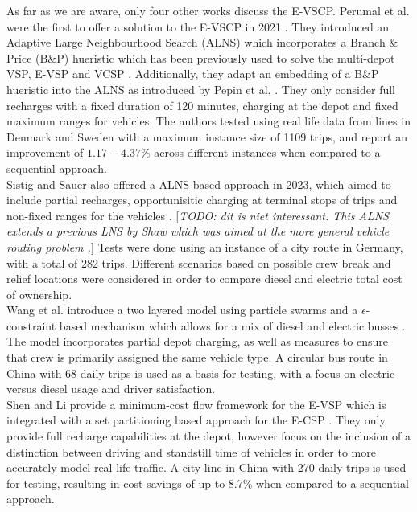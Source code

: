 \documentclass[]{article}
\newcommand{\todo}[1]{{\color{red}[\textit{TODO: #1}]}}
\begin{document}
As far as we are aware, only four other works discuss the E-VSCP. Perumal et al. were the first to offer a solution to the E-VSCP in 2021 \cite{PERUMAL2021105268}. They introduced an Adaptive Large Neighbourhood Search (ALNS) which incorporates a Branch \& Price (B\&P) hueristic which has been previously used to solve the multi-depot VSP, E-VSP and VCSP \cite{Pepin2009, Haase1996, vanKootenNiekerk2017}. Additionally, they adapt an embedding of a B\&P hueristic into the ALNS as introduced by Pepin et al. \cite{Pepin2009}. They only consider full recharges with a fixed duration of 120 minutes, charging at the depot and fixed maximum ranges for vehicles. The authors tested using real life data from lines in Denmark and Sweden with a maximum instance size of 1109 trips, and report an improvement of $1.17-4.37\%$ across different instances when compared to a sequential approach. \\
Sistig and Sauer also offered a ALNS based approach in 2023, which aimed to include partial recharges, opportunisitic charging at terminal stops of trips and non-fixed ranges for the vehicles \cite{SISTIG2023120915}. \todo{dit is niet interessant. This ALNS extends a previous LNS by Shaw which was aimed at the more general vehicle routing problem \cite{Shaw1997ANL, Shaw1998ANL}.} Tests were done using an instance of a city route in Germany, with a total of 282 trips. Different scenarios based on possible crew break and relief locations were considered in order to compare diesel and electric total cost of ownership. \\
Wang et al. introduce a two layered model using particle swarms and a $\epsilon$-constraint based mechanism which allows for a mix of diesel and electric busses \cite{su14063627}. The model incorporates partial depot charging, as well as measures to ensure that crew is primarily assigned the same vehicle type. A circular bus route in China with 68 daily trips is used as a basis for testing, with a focus on electric versus diesel usage and driver satisfaction. \\
Shen and Li provide a minimum-cost flow framework for the E-VSP which is integrated with a set partitioning based approach for the E-CSP \cite{SHEN2023}. They only provide full recharge capabilities at the depot, however focus on the inclusion of a distinction between driving and standstill time of vehicles in order to more accurately model real life traffic. A city line in China with 270 daily trips is used for testing, resulting in cost savings of up to 8.7\% when compared to a sequential approach.
\end{document}
